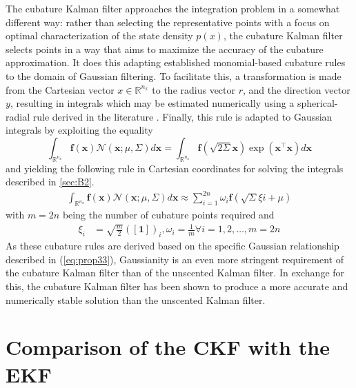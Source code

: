 
The cubature Kalman filter approaches the integration problem in a somewhat different way: rather than selecting the representative points with a focus on optimal characterization of the state density $p(x)$, the cubature Kalman filter selects points in a way that aims to maximize the accuracy of the cubature approximation. It does this adapting established monomial-based cubature rules to the domain of Gaussian filtering. To facilitate this, a transformation is made from the Cartesian vector $x \in \mathbb{R}^{n_{x}}$ to the radius vector $r$, and the direction vector $y$, resulting in integrals which may be estimated numerically using a spherical-radial rule derived in the literature \cite{Arasaratnam09b}. Finally, this rule is adapted to Gaussian integrals by exploiting the equality
\begin{equation} \label{eq:prop33}
    \int_{\mathbb{R}^{n_{x}}} \mathbf{f}(\mathbf{x})\mathcal{N}\left(\mathbf{x} ; \mu,\Sigma \right) d\mathbf{x} = \int_{\mathbb{R}^{n_{x}}} \mathbf{f}(\sqrt{2\Sigma}\mathbf{x})\exp{\left(\mathbf{x}^{\top}\mathbf{x}\right)} d\mathbf{x}
\end{equation}
and yielding the following rule in Cartesian coordinates for solving the integrals described in \ref{sec:B2}.
\begin{align}
    \int_{\mathbb{R}^{n_{x}}} \mathbf{f}(\mathbf{x})\mathcal{N}\left(\mathbf{x} ; \mu,\Sigma \right) d\mathbf{x} \approx \sum_{i=1}^{2n} \omega_{i} \mathbf{f}(\sqrt{\Sigma}\xi{i} + \mu)
\end{align}
with $m = 2n$ being the number of cubature points required and
\begin{align}
    \xi_{i} &= \sqrt{\frac{m}{2}}([\mathbf{1}])_{i}, \omega_{i} = \frac{1}{m} \forall i = 1,2,\hdots,m=2n
\end{align}
As these cubature rules are derived based on the specific Gaussian relationship described in (\ref{eq:prop33}), Gaussianity is an even more stringent requirement of the cubature Kalman filter than of the unscented Kalman filter. In exchange for this, the cubature Kalman filter has been shown to produce a more accurate and numerically stable solution than the unscented Kalman filter.

\section{Comparison of the CKF with the EKF}
\label{sec:comparison}

